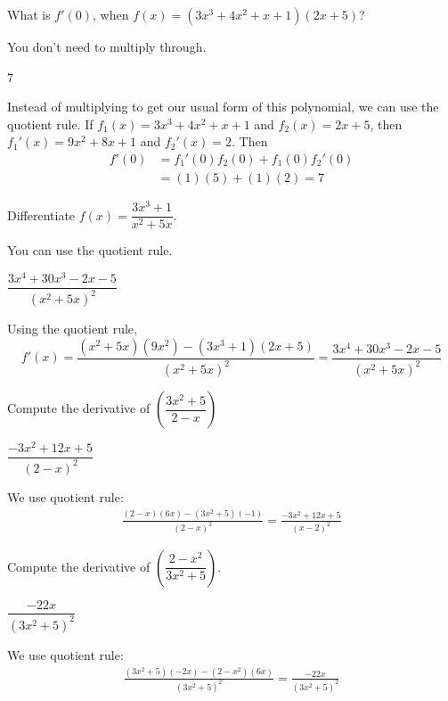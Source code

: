 \begin{question} What is $f'(0)$, when $f(x)=(3x^3+4x^2+x+1)(2x+5)$?
\end{question}
\begin{hint} You don't need to multiply through.
\end{hint}
\begin{answer} 7
\end{answer}
\begin{solution} Instead of multiplying to get our usual form of this polynomial, we can use the quotient rule. If $f_1(x)=3x^3+4x^2+x+1$ and $f_2(x)=2x+5$, then\\ $f_1'(x)=9x^2+8x+1$ and $f_2'(x)=2$. Then
\begin{align*}
f'(0)&=f_1'(0)f_2(0)+f_1(0)f_2'(0)\\
&=(1)(5)+(1)(2)=7\end{align*}
\end{solution}


\begin{question} Differentiate $f(x)=\dfrac{3x^3+1}{x^2+5x}$.
\end{question}
\begin{hint} You can use the quotient rule.
\end{hint}
\begin{answer} $\dfrac{3x^4+30x^3-2x-5}{(x^2+5x)^2}
$
\end{answer}
\begin{solution} Using the quotient rule,
\[f'(x) = \frac{(x^2+5x)(9x^2)-(3x^3+1)(2x+5)}{(x^2+5x)^2}
= \frac{3x^4+30x^3-2x-5}{(x^2+5x)^2}
\]\end{solution}


\begin{question} [2015Q]
Compute the derivative of $\left(\dfrac{3x^2+5}{2-x}\right)$
\end{question}
\begin{answer} $\dfrac{-3x^2+12x+5}{(2-x)^2}$
\end{answer}
\begin{solution}
We use quotient rule:
\begin{align*}
\frac{(2-x)(6x)-(3x^2+5)(-1)}{(2-x)^2}=\frac{-3x^2+12x+5}{(x-2)^2}
\end{align*}
\end{solution}


\begin{question}[2015Q]
Compute the derivative of $\left(\dfrac{2-x^2}{3x^2+5}\right)$.
\end{question}
\begin{answer} $\dfrac{-22x}{(3x^2+5)^2}$
\end{answer}
\begin{solution}
We use quotient rule:
\begin{align*}
\frac{(3x^2+5)(-2x) - (2-x^2)(6x)}{(3x^2+5)^2}=\frac{-22x}{(3x^2+5)^2}
\end{align*}
\end{solution}



